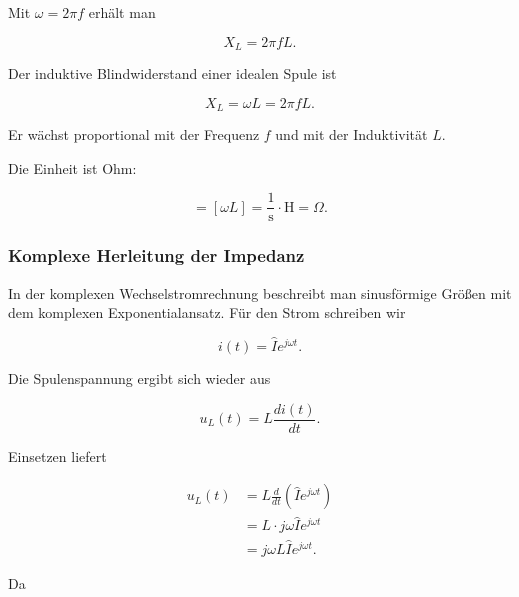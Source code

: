 Mit \(\omega = 2\pi f\) erhält man

\begin{equation}
	X_L = 2\pi f L.
	\label{eq:induktiver-blindwiderstand-frequenz}
\end{equation}

\begin{MathBox}
	\label{box:induktiver-blindwiderstand}
	Der induktive Blindwiderstand einer idealen Spule ist
	
	\[
	X_L = \omega L = 2\pi f L.
	\]
	
	Er wächst proportional mit der Frequenz \(f\) und mit der Induktivität \(L\).
\end{MathBox}

Die Einheit ist Ohm:

\begin{equation}
	[X_L]
	=
	[\omega L]
	=
	\frac{1}{\mathrm{s}} \cdot \mathrm{H}
	=
	\Omega.
	\label{eq:einheit-induktiver-blindwiderstand}
\end{equation}

\subsubsection{Komplexe Herleitung der Impedanz}
\label{subsubsec:komplexe-herleitung-impedanz-spule}

In der komplexen Wechselstromrechnung beschreibt man sinusförmige Größen mit
dem komplexen Exponentialansatz. Für den Strom schreiben wir

\begin{equation}
	i(t) = \hat{I} e^{j\omega t}.
	\label{eq:spule-komplexer-strom}
\end{equation}

Die Spulenspannung ergibt sich wieder aus

\begin{equation}
	u_L(t) = L \frac{di(t)}{dt}.
	\label{eq:spule-komplexe-grundgleichung}
\end{equation}

Einsetzen liefert

\begin{align}
	u_L(t)
	&= L \frac{d}{dt}
	\left(
	\hat{I} e^{j\omega t}
	\right) \\[4pt]
	&= L \cdot j\omega \hat{I} e^{j\omega t} \\[4pt]
	&= j\omega L \hat{I} e^{j\omega t}.
	\label{eq:spule-komplexe-spannung}
\end{align}

Da

